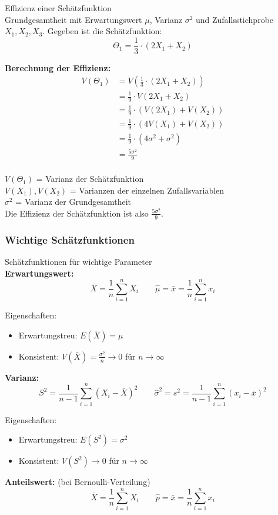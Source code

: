 \begin{example2}{Effizienz einer Schätzfunktion}\\
Grundgesamtheit mit Erwartungswert $\mu$, Varianz $\sigma^2$ und Zufallsstichprobe $X_1, X_2, X_3$. Gegeben ist die Schätzfunktion:
$$
\Theta_1=\frac{1}{3} \cdot(2X_1+X_2)
$$

\textbf{Berechnung der Effizienz:}
$$
\begin{aligned}
V(\Theta_1) &= V(\frac{1}{3} \cdot(2X_1+X_2)) \\
&= \frac{1}{9} \cdot V(2X_1+X_2) \\
&= \frac{1}{9} \cdot (V(2X_1) + V(X_2)) \\
&= \frac{1}{9} \cdot (4V(X_1) + V(X_2)) \\
&= \frac{1}{9} \cdot (4\sigma^2 + \sigma^2) \\
&= \frac{5\sigma^2}{9}
\end{aligned}
$$
\\
$V(\Theta_1)$ = Varianz der Schätzfunktion\\
$V(X_1), V(X_2)$ = Varianzen der einzelnen Zufallsvariablen\\
$\sigma^2$ = Varianz der Grundgesamtheit\\

Die Effizienz der Schätzfunktion ist also $\frac{5\sigma^2}{9}$.
\end{example2}

\subsubsection{Wichtige Schätzfunktionen}

\begin{theorem}{Schätzfunktionen für wichtige Parameter}\\
\textbf{Erwartungswert:}
\[\bar{X} = \frac{1}{n}\sum_{i=1}^n X_i \qquad \hat{\mu} = \bar{x} = \frac{1}{n}\sum_{i=1}^n x_i\]

Eigenschaften:
\begin{itemize}
  \item Erwartungstreu: $E(\bar{X}) = \mu$
  \item Konsistent: $V(\bar{X}) = \frac{\sigma^2}{n} \to 0$ für $n \to \infty$
\end{itemize}

\textbf{Varianz:}
\[S^2 = \frac{1}{n-1}\sum_{i=1}^n (X_i-\bar{X})^2 \qquad \hat{\sigma}^2 = s^2 = \frac{1}{n-1}\sum_{i=1}^n (x_i-\bar{x})^2\]

Eigenschaften:
\begin{itemize}
  \item Erwartungstreu: $E(S^2) = \sigma^2$
  \item Konsistent: $V(S^2) \to 0$ für $n \to \infty$
\end{itemize}

\textbf{Anteilswert:} (bei Bernoulli-Verteilung)
\[\bar{X} = \frac{1}{n}\sum_{i=1}^n X_i \qquad \hat{p} = \bar{x} = \frac{1}{n}\sum_{i=1}^n x_i\]
\end{theorem}

